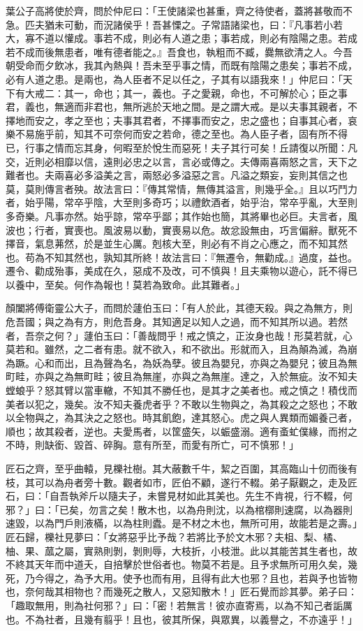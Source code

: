 \begin{pinyinscope}
葉公子高將使於齊，問於仲尼曰：「王使諸梁也甚重，齊之待使者，蓋將甚敬而不急。匹夫猶未可動，而況諸侯乎！吾甚慄之。子常語諸梁也，曰：『凡事若小若大，寡不道以懽成。事若不成，則必有人道之患；事若成，則必有陰陽之患。若成若不成而後無患者，唯有德者能之。』吾食也，執粗而不臧，爨無欲清之人。今吾朝受命而夕飲冰，我其內熱與！吾未至乎事之情，而既有陰陽之患矣；事若不成，必有人道之患。是兩也，為人臣者不足以任之，子其有以語我來！」仲尼曰：「天下有大戒二：其一，命也；其一，義也。子之愛親，命也，不可解於心；臣之事君，義也，無適而非君也，無所逃於天地之間。是之謂大戒。是以夫事其親者，不擇地而安之，孝之至也；夫事其君者，不擇事而安之，忠之盛也；自事其心者，哀樂不易施乎前，知其不可奈何而安之若命，德之至也。為人臣子者，固有所不得已，行事之情而忘其身，何暇至於悅生而惡死！夫子其行可矣！丘請復以所聞：凡交，近則必相靡以信，遠則必忠之以言，言必或傳之。夫傳兩喜兩怒之言，天下之難者也。夫兩喜必多溢美之言，兩怒必多溢惡之言。凡溢之類妄，妄則其信之也莫，莫則傳言者殃。故法言曰：『傳其常情，無傳其溢言，則幾乎全。』且以巧鬥力者，始乎陽，常卒乎陰，大至則多奇巧；以禮飲酒者，始乎治，常卒乎亂，大至則多奇樂。凡事亦然。始乎諒，常卒乎鄙；其作始也簡，其將畢也必巨。夫言者，風波也；行者，實喪也。風波易以動，實喪易以危。故忿設無由，巧言偏辭。獸死不擇音，氣息茀然，於是並生心厲。剋核大至，則必有不肖之心應之，而不知其然也。苟為不知其然也，孰知其所終！故法言曰：『無遷令，無勸成。』過度，益也。遷令、勸成殆事，美成在久，惡成不及改，可不慎與！且夫乘物以遊心，託不得已以養中，至矣。何作為報也！莫若為致命。此其難者。」

顏闔將傅衛靈公大子，而問於蘧伯玉曰：「有人於此，其德天殺。與之為無方，則危吾國；與之為有方，則危吾身。其知適足以知人之過，而不知其所以過。若然者，吾奈之何？」蘧伯玉曰：「善哉問乎！戒之慎之，正汝身也哉！形莫若就，心莫若和。雖然，之二者有患。就不欲入，和不欲出。形就而入，且為顛為滅，為崩為蹶。心和而出，且為聲為名，為妖為孽。彼且為嬰兒，亦與之為嬰兒；彼且為無町畦，亦與之為無町畦；彼且為無崖，亦與之為無崖。達之，入於無疵。汝不知夫螳蜋乎？怒其臂以當車轍，不知其不勝任也，是其才之美者也。戒之慎之！積伐而美者以犯之，幾矣。汝不知夫養虎者乎？不敢以生物與之，為其殺之之怒也；不敢以全物與之，為其決之之怒也。時其飢飽，達其怒心。虎之與人異類而媚養己者，順也；故其殺者，逆也。夫愛馬者，以筐盛矢，以蜄盛溺。適有蚉虻僕緣，而拊之不時，則缺銜、毀首、碎胸。意有所至，而愛有所亡，可不慎邪！」

匠石之齊，至乎曲轅，見櫟社樹。其大蔽數千牛，絜之百圍，其高臨山十仞而後有枝，其可以為舟者旁十數。觀者如市，匠伯不顧，遂行不輟。弟子厭觀之，走及匠石，曰：「自吾執斧斤以隨夫子，未嘗見材如此其美也。先生不肯視，行不輟，何邪？」曰：「已矣，勿言之矣！散木也，以為舟則沈，以為棺槨則速腐，以為器則速毀，以為門戶則液樠，以為柱則蠹。是不材之木也，無所可用，故能若是之壽。」匠石歸，櫟社見夢曰：「女將惡乎比予哉？若將比予於文木邪？夫柤、梨、橘、柚、果、蓏之屬，實熟則剝，剝則辱，大枝折，小枝泄。此以其能苦其生者也，故不終其天年而中道夭，自掊擊於世俗者也。物莫不若是。且予求無所可用久矣，幾死，乃今得之，為予大用。使予也而有用，且得有此大也邪？且也，若與予也皆物也，奈何哉其相物也？而幾死之散人，又惡知散木！」匠石覺而診其夢。弟子曰：「趣取無用，則為社何邪？」曰：「密！若無言！彼亦直寄焉，以為不知己者詬厲也。不為社者，且幾有翦乎！且也，彼其所保，與眾異，以義譽之，不亦遠乎！」


\end{pinyinscope}

